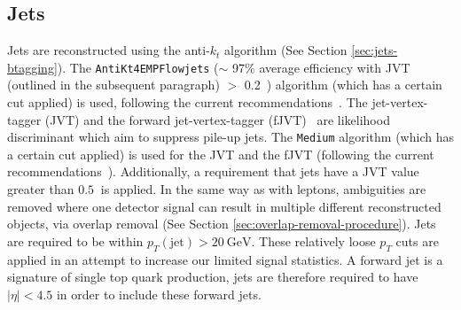 \subsection{Jets}
Jets are reconstructed using the anti-$k_{t}$ algorithm (See Section \ref{sec:jets-btagging}). The \texttt{AntiKt4EMPFlowjets} ($\sim$ 97$\%$ average efficiency with JVT (outlined in the subsequent paragraph) $>$ 0.2~\cite{TopRecoObjTwikiModel}) algorithm (which has a certain cut applied) is used, following the current recommendations~\cite{TopRecoObjTwikiModel}. The jet-vertex-tagger (JVT) and the forward jet-vertex-tagger (fJVT)~\cite{ATL-PHYS-PUB-2015-034} are likelihood discriminant which aim to suppress pile-up jets. The \texttt{Medium} algorithm (which has a certain cut applied) is used for the JVT and the fJVT (following the current recommendations~\cite{JVTandfJVT-Recommendations}). Additionally, a requirement that jets have a JVT value greater than $\SI{0.5}{}$ is applied. In the same way as with leptons, ambiguities are removed where one detector signal can result in multiple different reconstructed objects, via overlap removal (See Section \ref{sec:overlap-removal-procedure}). Jets are required to be within $p_{T}(\text{jet}) > \SI{20}{\GeV}$. These relatively loose $p_T$ cuts are applied in an attempt to increase our limited signal statistics. A forward jet is a signature of single top quark production, jets are therefore required to have $|\eta| < 4.5$ in order to include these forward jets.

